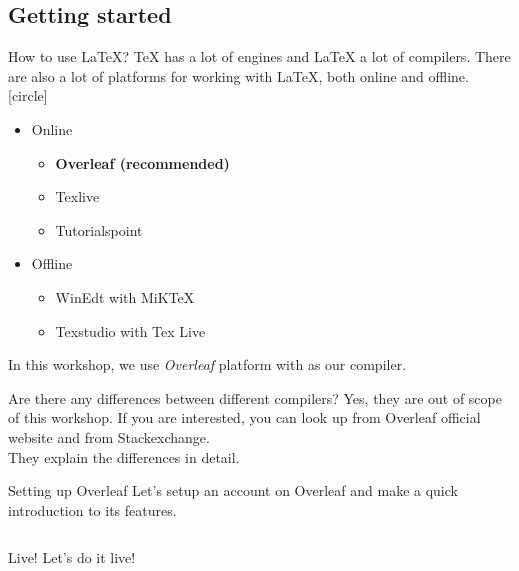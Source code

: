 \documentclass[10pt,xcolor={dvipsnames}, aspectratio=169]{beamer}
\begin{document}
    \subsection{Getting started}
    \begin{frame}{How to use \LaTeX?}
        \TeX \xspace has a lot of engines and \LaTeX \xspace a lot of compilers. There are also a lot of platforms for working with \LaTeX \xspace, both online and offline.
        [circle]
        \begin{itemize}
            \item Online
            \begin{itemize}
                \item \textbf{Overleaf (recommended)}
                \item Texlive
                \item Tutorialspoint
            \end{itemize}
            \item Offline
                \begin{itemize}
                    \item WinEdt with MiKTeX
                    \item Texstudio with Tex Live
                \end{itemize}
        \end{itemize}
        In this workshop, we use \textit{Overleaf} platform with  as our compiler.
    \end{frame}
        \begin{frame}{Are there any differences between different compilers?}
        Yes, they are out of scope of this workshop.
        If you are interested, you can look up \href{https://www.overleaf.com/learn/latex/Choosing_a_LaTeX_Compiler}{} from Overleaf official website and \href{https://tex.stackexchange.com/questions/13593/the-differences-between-tex-engines}{} from Stackexchange. \\
        \medskip
        They explain the differences in detail.
    \end{frame}

\begin{frame}{Setting up Overleaf}
    Let's setup an account on Overleaf and make a quick introduction to its features.
    \bigskip
    \begin{center}
    \begin{columns}
        \begin{column}{0.5 \textwidth}
        \begin{block}{Live!}
			Let's do it live!
		\end{block}
		\end{column}
    \end{columns}
    \end{center}
\end{frame}
\end{document}
